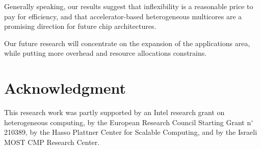 \documentclass[twocolumn,english]{IEEEtran}
\begin{document}
Generally speaking, our results suggest that inflexibility is a reasonable
price to pay for efficiency, and that accelerator-based heterogeneous
multicores are a promising direction for future chip architectures.

Our future research will concentrate on the expansion of the applications
area, while putting more overhead and resource allocations constrains. 


\section*{Acknowledgment}

This research work was partly supported by an Intel research grant
on heterogeneous computing, by the European Research Council Starting
Grant n$^{\circ}$ 210389, by the Hasso Plattner Center for Scalable
Computing, and by the Israeli MOST CMP Research Center. 


\end{document}
